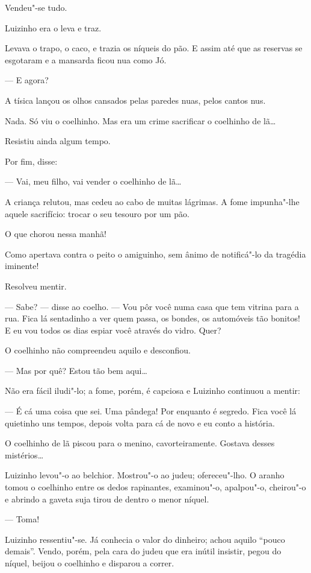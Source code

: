 Vendeu"-se tudo.

Luizinho era o leva e traz.

Levava o trapo, o caco, e trazia os níqueis do pão. E assim até que as
reservas se esgotaram e a mansarda ficou nua como Jó.

--- E agora?

A tísica lançou os olhos cansados pelas paredes nuas, pelos cantos nus.

Nada. Só viu o coelhinho. Mas era um crime sacrificar o coelhinho de
lã\ldots{}

Resistiu ainda algum tempo.

Por fim, disse:

--- Vai, meu filho, vai vender o coelhinho de lã\ldots{}

A criança relutou, mas cedeu ao cabo de muitas lágrimas. A fome
impunha"-lhe aquele sacrifício: trocar o seu tesouro por um pão.

O que chorou nessa manhã!

Como apertava contra o peito o amiguinho, sem ânimo de notificá"-lo da
tragédia iminente!

Resolveu mentir.

--- Sabe? --- disse ao coelho. --- Vou pôr você numa casa que tem
vitrina para a rua. Fica lá sentadinho a ver quem passa, os bondes, os
automóveis tão bonitos! E eu vou todos os dias espiar você através do
vidro. Quer?

O coelhinho não compreendeu aquilo e desconfiou.

--- Mas por quê? Estou tão bem aqui\ldots{}

Não era fácil iludi"-lo; a fome, porém, é capciosa e Luizinho continuou a
mentir:

--- É cá uma coisa que sei. Uma pândega! Por enquanto é segredo. Fica
você lá quietinho uns tempos, depois volta para cá de novo e eu conto a
história.

O coelhinho de lã piscou para o menino, cavorteiramente. Gostava desses
mistérios\ldots{}

Luizinho levou"-o ao belchior. Mostrou"-o ao judeu; ofereceu"-lho. O aranho
tomou o coelhinho entre os dedos rapinantes, examinou"-o, apalpou"-o,
cheirou"-o e abrindo a gaveta suja tirou de dentro o menor níquel.

--- Toma!

Luizinho ressentiu"-se. Já conhecia o valor do dinheiro; achou aquilo
``pouco demais''. Vendo, porém, pela cara do judeu que era inútil
insistir, pegou do níquel, beijou o coelhinho e disparou a correr.


